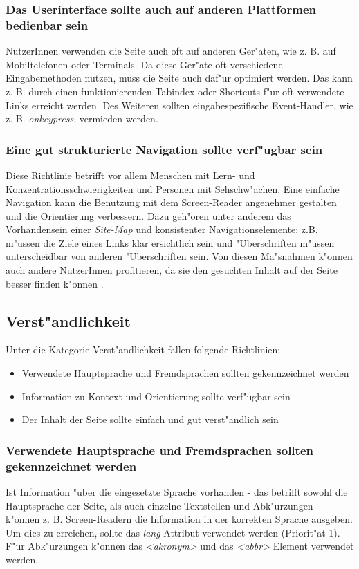 \documentclass[a4paper,bibtotoc,oneside]{scrbook}
\begin{document}
\subsubsection{Das Userinterface sollte auch auf anderen Plattformen bedienbar sein}
NutzerInnen verwenden die Seite auch oft auf anderen Ger"aten, wie z. B. auf Mobiltelefonen oder Terminals. Da diese Ger"ate oft verschiedene Eingabemethoden nutzen, muss die Seite auch daf"ur optimiert werden. Das kann z. B. durch einen funktionierenden Tabindex oder Shortcuts f"ur oft verwendete Links erreicht werden. Des Weiteren sollten eingabespezifische Event-Handler, wie z. B. \emph{onkeypress}, vermieden werden. \cite[Abschnitt 6.9]{wcag1}

\subsubsection{Eine gut strukturierte Navigation sollte verf"ugbar sein}
Diese Richtlinie betrifft vor allem Menschen mit Lern- und Konzentrationsschwierigkeiten und Personen mit Sehschw"achen. Eine einfache Navigation kann die Benutzung mit dem Screen-Reader angenehmer gestalten und die Orientierung verbessern. Dazu geh"oren unter anderem das Vorhandensein einer \emph{Site-Map} und konsistenter Navigationselemente: z.B. m"ussen die Ziele eines Links klar ersichtlich sein und "Uberschriften m"ussen unterscheidbar von anderen "Uberschriften sein. \cite[Abschnitt 6.13]{wcag1}
Von diesen Ma"snahmen k"onnen auch andere NutzerInnen profitieren, da sie den gesuchten Inhalt auf der Seite besser finden k"onnen \cite[S. 52]{barr_webd}.

\subsection{Verst"andlichkeit}
Unter die Kategorie Verst"andlichkeit fallen folgende Richtlinien: 

\begin{itemize}
\item Verwendete Hauptsprache und Fremdsprachen sollten gekennzeichnet werden\cite[Abschnitt 6.4]{wcag1}
\item Information zu Kontext und Orientierung sollte verf"ugbar sein\cite[Abschnitt 6.12]{wcag1}
\item Der Inhalt der Seite sollte einfach und gut verst"andlich sein\cite[Abschnitt 6.14]{wcag1}
\end{itemize}

\subsubsection{Verwendete Hauptsprache und Fremdsprachen sollten gekennzeichnet werden}
Ist Information "uber die eingesetzte Sprache vorhanden - das betrifft sowohl die Hauptsprache der Seite, als auch einzelne Textstellen und Abk"urzungen - k"onnen z. B. Screen-Readern die Information in der korrekten Sprache ausgeben. Um dies zu erreichen, sollte das \emph{lang} Attribut verwendet werden (Priorit"at 1). F"ur Abk"urzungen k"onnen das \emph{<akronym>} und das \emph{<abbr>} Element verwendet werden. \cite[Abschnitt 6.4]{wcag1}
\end{document}
